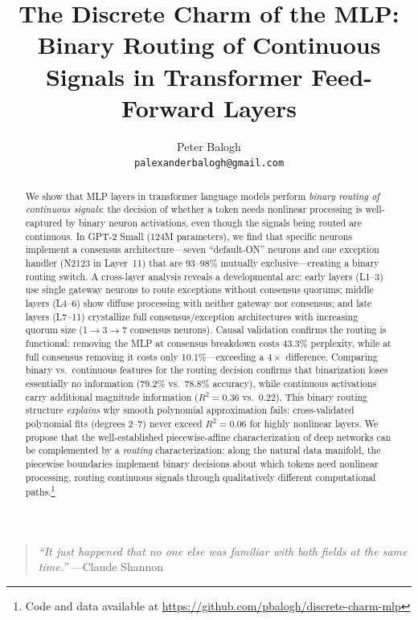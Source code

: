\documentclass{article}
\title{The Discrete Charm of the MLP:\\
  Binary Routing of Continuous Signals in Transformer Feed-Forward Layers}
\author{
  Peter Balogh \\
  \texttt{palexanderbalogh@gmail.com}
}
\newcommand{\codeurl}{\url{https://github.com/pbalogh/discrete-charm-mlp}}
\begin{document}
\maketitle

\begin{quote}
\emph{``It just happened that no one else was familiar with both fields at the same time.''}
\hfill ---Claude Shannon
\end{quote}

\begin{abstract}
We show that MLP layers in transformer language models perform \emph{binary routing of
continuous signals}: the decision of whether a token needs nonlinear processing is
well-captured by binary neuron activations, even though the signals being routed are
continuous.
In GPT-2 Small (124M parameters), we find that specific neurons implement a consensus
architecture---seven ``default-ON'' neurons and one exception handler (N2123 in Layer~11)
that are 93--98\% mutually exclusive---creating a binary routing switch.
A cross-layer analysis reveals a developmental arc: early layers (L1--3) use single
gateway neurons to route exceptions without consensus quorums; middle layers (L4--6)
show diffuse processing with neither gateway nor consensus; and late layers (L7--11)
crystallize full consensus/exception architectures with increasing quorum size
(1$\to$3$\to$7 consensus neurons). Causal validation confirms the routing is
functional: removing the MLP at consensus breakdown costs 43.3\% perplexity,
while at full consensus removing it costs only 10.1\%---exceeding a $4\times$ difference. Comparing binary vs.\ continuous features for
the routing decision confirms that binarization loses essentially no information (79.2\%
vs.\ 78.8\% accuracy), while continuous activations carry additional magnitude information
($R^2 = 0.36$ vs.\ $0.22$). This binary routing structure \emph{explains} why smooth
polynomial approximation fails: cross-validated polynomial fits
(degrees 2--7) never exceed $R^2 = 0.06$ for highly nonlinear layers.
We propose that the well-established piecewise-affine characterization of deep networks
\citep{balestriero2018spline} can be complemented by a \emph{routing} characterization:
along the natural data manifold, the piecewise boundaries implement binary decisions about
which tokens need nonlinear processing, routing continuous signals through qualitatively
different computational paths.\footnote{Code and data available at \codeurl}
\end{abstract}
\end{document}
